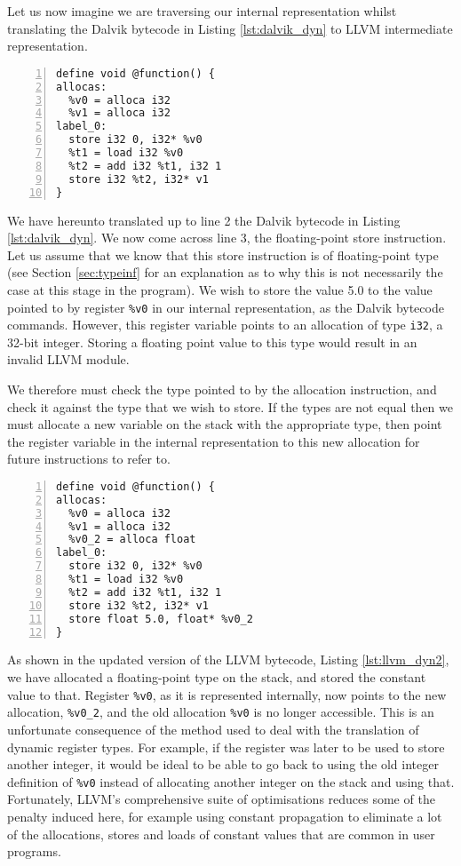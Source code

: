 Let us now imagine we are traversing our internal representation whilst translating the Dalvik bytecode in Listing \ref{lst:dalvik_dyn} to LLVM intermediate representation.

\begin{lstlisting}[frame=single, numbers=left, numberstyle=\tiny, caption={LLVM IR for Listing \ref{lst:dalvik_dyn}}, label=lst:llvm_dyn] 
define void @function() {
allocas:
  %v0 = alloca i32
  %v1 = alloca i32
label_0:
  store i32 0, i32* %v0
  %t1 = load i32 %v0
  %t2 = add i32 %t1, i32 1
  store i32 %t2, i32* v1
}
\end{lstlisting}

We have hereunto translated up to line 2 the Dalvik bytecode in Listing \ref{lst:dalvik_dyn}. We now come across line 3, the floating-point store instruction. Let us assume that we know that this store instruction is of floating-point type (see Section \ref{sec:typeinf} for an explanation as to why this is not necessarily the case at this stage in the program). We wish to store the value 5.0 to the value pointed to by register \verb|%v0| in our internal representation, as the Dalvik bytecode commands. However, this register variable points to an allocation of type \verb|i32|, a 32-bit integer. Storing a floating point value to this type would result in an invalid LLVM module.

We therefore must check the type pointed to by the allocation instruction, and check it against the type that we wish to store. If the types are not equal then we must allocate a new variable on the stack with the appropriate type, then point the register variable in the internal representation to this new allocation for future instructions to refer to.

\begin{lstlisting}[frame=single, numbers=left, numberstyle=\tiny, caption={LLVM IR for Listing \ref{lst:dalvik_dyn} (cont.)}, label=lst:llvm_dyn2]
define void @function() {
allocas:
  %v0 = alloca i32
  %v1 = alloca i32
  %v0_2 = alloca float
label_0:
  store i32 0, i32* %v0
  %t1 = load i32 %v0
  %t2 = add i32 %t1, i32 1
  store i32 %t2, i32* v1
  store float 5.0, float* %v0_2
}
\end{lstlisting}

As shown in the updated version of the LLVM bytecode, Listing \ref{lst:llvm_dyn2}, we have allocated a floating-point type on the stack, and stored the constant value to that. Register \verb|%v0|, as it is represented internally, now points to the new allocation, \verb|%v0_2|, and the old allocation \verb|%v0| is no longer accessible. This is an unfortunate consequence of the method used to deal with the translation of dynamic register types. For example, if the register was later to be used to store another integer, it would be ideal to be able to go back to using the old integer definition of \verb|%v0| instead of allocating another integer on the stack and using that. Fortunately, LLVM's comprehensive suite of optimisations reduces some of the penalty induced here, for example using constant propagation to eliminate a lot of the allocations, stores and loads of constant values that are common in user programs.
